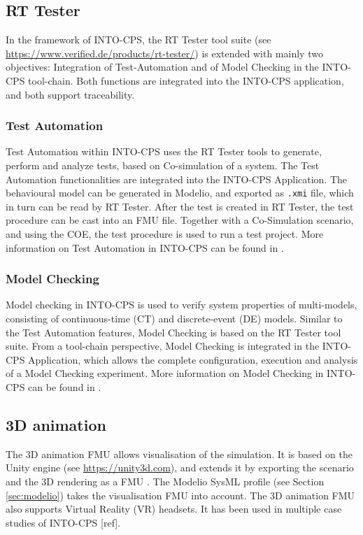 \subsection{RT Tester}

In the framework of INTO-CPS, the RT Tester tool suite (see \url{https://www.verified.de/products/rt-tester/}) is extended with mainly two objectives: Integration of Test-Automation and of Model Checking in the INTO-CPS tool-chain. Both functions are integrated into the INTO-CPS application, and both support traceability.

\subsubsection{Test Automation}

Test Automation within INTO-CPS uses the RT Tester tools to generate, perform and analyze tests, based on Co-simulation of a system. The Test Automation functionalities are integrated into the INTO-CPS Application. The behavioural model can be generated in Modelio, and exported as \texttt{.xmi} file, which in turn can be read by RT Tester. After the test is created in RT Tester, the test procedure can be cast into an FMU file. Together with a Co-Simulation scenario, and using the COE, the test procedure is used to run a test project. More information on Test Automation in INTO-CPS can be found in \cite{INTOCPSD5.3b}.

\subsubsection{Model Checking}

Model checking in INTO-CPS is used to verify system properties of multi-models, consisting of continuous-time (CT) and discrete-event (DE) models. Similar to the Test Automation features, Model Checking is based on the RT Tester tool suite. From a tool-chain perspective, Model Checking is integrated in the INTO-CPS Application, which allows the complete configuration, execution and analysis of a Model Checking experiment. More information on Model Checking in INTO-CPS can be found in \cite{INTOCPSD5.3c}.


\subsection{3D animation}

The 3D animation FMU allows visualisation of the simulation. It is based on the Unity engine (see \url{https://unity3d.com}), and extends it by exporting the scenario and the 3D rendering as a FMU \cite{Foldager&17}. The Modelio SysML profile (see Section \ref{sec:modelio}) takes the visualisation FMU into account. The 3D animation FMU also supports Virtual Reality (VR) headsets. It has been used in multiple case studies of INTO-CPS [ref].


